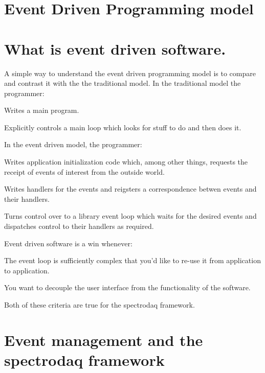 \section{Event Driven Programming model}\label{EventDriven}


\section{What is event driven software.}\label{WhatisEventDriven}


A simple way to understand the event driven programming model is to compare  and contrast it with the the traditional model. In the traditional model the  programmer:\begin{CompactItemize}
\item 
Writes a main program.\item 
Explicitly controls a main loop which looks for stuff to do and then does it.\end{CompactItemize}
In the event driven model, the programmer:\begin{CompactItemize}
\item 
Writes application initialization code which, among other things,  requests the receipt of events of interest from the outside world.\item 
Writes handlers for the events and reigsters a correspondence betwen events and their handlers.\item 
Turns control over to a library event loop which waits for the desired events and dispatches control to their handlers as required.\end{CompactItemize}
Event driven software is a win whenever:\begin{CompactItemize}
\item 
The event loop is sufficiently complex that you'd like to re-use it from application to application.\item 
You want to decouple the user interface from the functionality of the software.\end{CompactItemize}
Both of these criteria are true for the spectrodaq framework.

\section{Event management and the spectrodaq framework}\label{FWKEventManagement}


